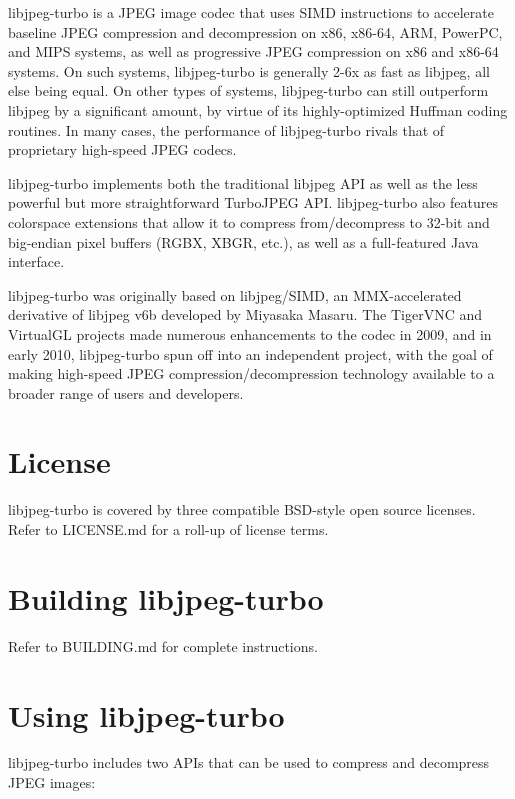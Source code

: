 libjpeg-\/turbo is a J\+P\+EG image codec that uses S\+I\+MD instructions to accelerate baseline J\+P\+EG compression and decompression on x86, x86-\/64, A\+RM, Power\+PC, and M\+I\+PS systems, as well as progressive J\+P\+EG compression on x86 and x86-\/64 systems. On such systems, libjpeg-\/turbo is generally 2-\/6x as fast as libjpeg, all else being equal. On other types of systems, libjpeg-\/turbo can still outperform libjpeg by a significant amount, by virtue of its highly-\/optimized Huffman coding routines. In many cases, the performance of libjpeg-\/turbo rivals that of proprietary high-\/speed J\+P\+EG codecs.

libjpeg-\/turbo implements both the traditional libjpeg A\+PI as well as the less powerful but more straightforward Turbo\+J\+P\+EG A\+PI. libjpeg-\/turbo also features colorspace extensions that allow it to compress from/decompress to 32-\/bit and big-\/endian pixel buffers (R\+G\+BX, X\+B\+GR, etc.), as well as a full-\/featured Java interface.

libjpeg-\/turbo was originally based on libjpeg/\+S\+I\+MD, an M\+M\+X-\/accelerated derivative of libjpeg v6b developed by Miyasaka Masaru. The Tiger\+V\+NC and Virtual\+GL projects made numerous enhancements to the codec in 2009, and in early 2010, libjpeg-\/turbo spun off into an independent project, with the goal of making high-\/speed J\+P\+EG compression/decompression technology available to a broader range of users and developers.

\section*{License }

libjpeg-\/turbo is covered by three compatible B\+S\+D-\/style open source licenses. Refer to L\+I\+C\+E\+N\+SE.md for a roll-\/up of license terms.

\section*{Building libjpeg-\/turbo }

Refer to B\+U\+I\+L\+D\+I\+NG.md for complete instructions.

\section*{Using libjpeg-\/turbo }

libjpeg-\/turbo includes two A\+P\+Is that can be used to compress and decompress J\+P\+EG images\+:


